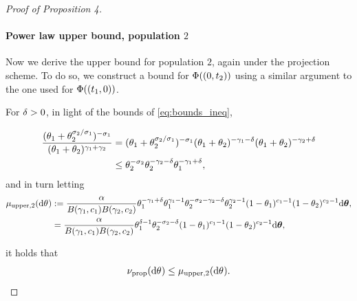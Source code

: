 \begin{proof}[Proof of Proposition 4]
\paragraph{Power law upper bound, population $2$}
Now we derive the upper bound for population $2$, again under the projection scheme. To do so, we construct a bound for $\Phi((0, t_2))$ using a similar argument to the one used for $\Phi((t_1, 0))$. 


For $\delta>0$, in light of the bounds of \cref{eq:bounds_ineq},

\begin{align*}
    \frac{(\theta_{1}+\theta_{2}^{\sigma_{2}/\sigma_{1}})^{-\sigma_{1}}}{(\theta_{1}+\theta_{2})^{\gamma_{1}+\gamma_{2}}}&=(\theta_{1}+\theta_{2}^{\sigma_{2}/\sigma_{1}})^{-\sigma_{1}}(\theta_{1}+\theta_{2})^{-\gamma_{1}-\delta}(\theta_{1}+\theta_{2})^{-\gamma_{2}+\delta}\\
    &\le \theta_{2}^{-\sigma_{2}}\theta_{2}^{-\gamma_{2}-\delta}\theta_{1}^{-\gamma_{1}+\delta},
\end{align*}
and in turn letting 
\begin{equation}
    \begin{aligned}
        \mu_{\mathrm{upper}, 2}(\de\vecvariantfreq{})&:= \frac{\mass}{B(\corr{1}, \conc{1})B(\corr{2}, \conc{2})}\variantfreqperpop{1}^{-\corr{1}+\smallpositive} \variantfreqperpop{1}^{\corr{1}-1}\variantfreqperpop{2}^{-\rate{2}-\corr{2}-\smallpositive}\variantfreqperpop{2}^{\corr{2}-1}(1-\variantfreqperpop{1})^{\conc{1}-1}(1-\variantfreqperpop{2})^{\conc{2}-1} \de \btheta,\\
        &=\frac{\mass}{B(\corr{1}, \conc{1})B(\corr{2}, \conc{2})}\variantfreqperpop{1}^{\smallpositive-1} \variantfreqperpop{2}^{-\rate{2}-\smallpositive}(1-\variantfreqperpop{1})^{\conc{1}-1}(1-\variantfreqperpop{2})^{\conc{2}-1} \de \btheta,
    \end{aligned}
\end{equation}


it holds that
\begin{align*}
    \ratemeasproposed(\de\vecvariantfreq{})\le \mu_{\mathrm{upper}, 2}(\de\vecvariantfreq{}).
\end{align*}



\end{proof}
